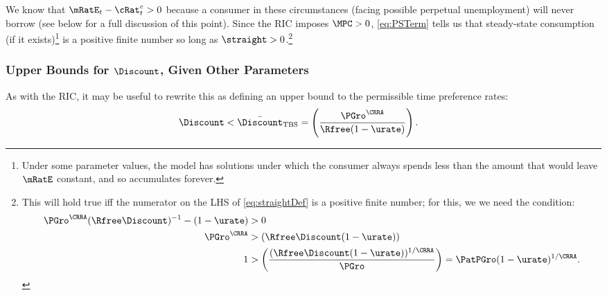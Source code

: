 \documentclass{\handout}
\begin{document}
We know that $\mRatE_{t}-{\cRat}^{e}_{t} > 0$ because a consumer in these circumstances (facing possible perpetual unemployment) will never borrow (see below for a full discussion of this point).  Since the RIC imposes $\MPCU>0$, \eqref{eq:PSTerm} tells us that steady-state consumption (if it exists)\footnote{Under some parameter values, the model has solutions under which the consumer always spends less than the amount that would leave $\mRatE$ constant, and so accumulates forever.} is a positive finite number so long as $\straight > 0$.\footnote{This will hold true iff the numerator on the LHS of \eqref{eq:straightDef} is a positive finite number; for this, we we need the condition:
\begin{equation}\begin{gathered}\begin{aligned}
        \PGro^{\CRRA}(\Rfree\Discount)^{-1}-(1-\urate) & >  0  \\
       \PGro^{\CRRA} & >  (\Rfree \Discount (1-\urate))
\\     1 & >  \left(\frac{(\Rfree \Discount (1-\urate))^{1/\CRRA}}{\PGro}\right) = \PatPGro (1-\urate)^{1/\CRRA} 
  \label{eq:GICExistsSoln} %
.\end{aligned}\end{gathered}\end{equation}
}

\hypertarget{GIFMax}{}\hypertarget{DiscountMaxGICTBS}{}

\subsubsection{Upper Bounds for $\Discount$, Given Other Parameters}


As with the RIC, it may be useful to rewrite this as defining an upper bound to the permissible time preference rates: \providecommand{\DiscountMaxGICTBS}{\bar{\Discount}_{\text{TBS}}}
\begin{equation}\begin{gathered}\begin{aligned}
\Discount < \DiscountMaxGICTBS & =  \left(\frac{\PGro^{\CRRA}}{\Rfree(1-\urate)}\right) \label{eq:DiscountMaxGICTBS}
.
\end{aligned}\end{gathered}\end{equation}
\end{document}
